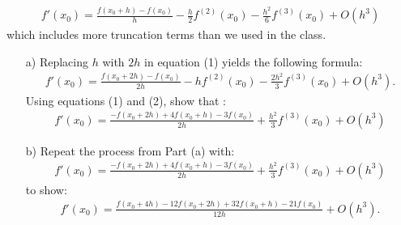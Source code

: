 \documentclass[12pt]{article}
\begin{document}
\begin{enumerate}[label=\bfseries Problem \arabic*:]
\begin{align}
f'(x_0)= \frac{f(x_0+h)-f(x_0)}{h}-\frac{h}{2} f^{(2)}(x_0)-\frac{h^2}{6} f^{(3)}(x_0)+O(h^3)
\end{align}
which includes more truncation terms than we used in the class.
 \begin{itemize}
\item[a)] Replacing $h$ with $2h$ in equation (1) yields the following formula:
\begin{align}
f'(x_0)= \frac{f(x_0+2h)-f(x_0)}{2h}-hf^{(2)}(x_0)-\frac{2h^2}{3} f^{(3)}(x_0)+O(h^3).
\end{align}
Using equations (1) and (2), show that :
\begin{align*}
f'(x_0)=\frac{-f(x_0+2h)+4f(x_0+h)-3f(x_0)}{2h}+\frac{h^2}{3} f^{(3)}(x_0)+O(h^3)
\end{align*}
\item[b)] Repeat the process from Part (a) with:
\begin{align*}
f'(x_0)=\frac{-f(x_0+2h)+4f(x_0+h)-3f(x_0)}{2h}+\frac{h^2}{3} f^{(3)}(x_0)+O(h^3)
\end{align*}
to show:
{ \begin{align*}
f'(x_0)=\frac{f(x_0+4h)-12f(x_0+2h)+32f(x_0+h)-21f(x_0)}{12h}+O(h^3).
\end{align*}}
 \end{itemize}



\end{enumerate}
\end{document}
